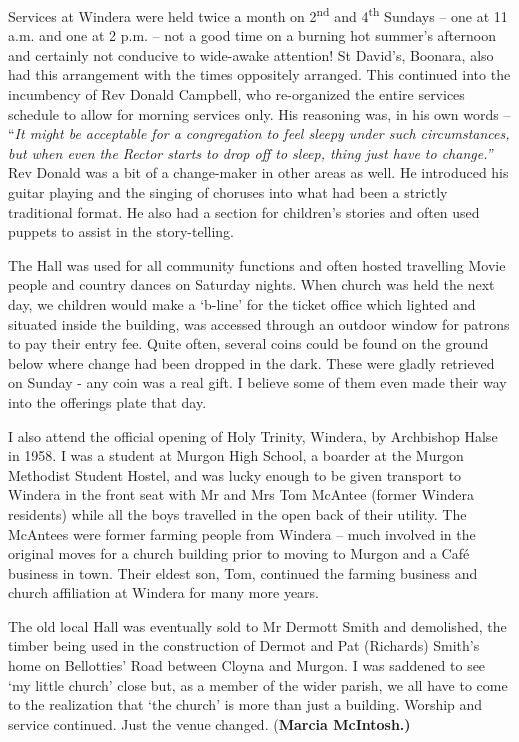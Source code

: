 Services at Windera were held twice a month on 2\textsuperscript{nd} and 4\textsuperscript{th} Sundays -- one at 11 a.m. and one at 2 p.m. -- not a good time on a burning hot summer's afternoon and certainly not conducive to wide-awake attention! St David's, Boonara, also had this arrangement with the times oppositely arranged. This continued into the incumbency of Rev Donald Campbell, who re-organized the entire services schedule to allow for morning services only. His reasoning was, in his own words -- ``\emph{It might be acceptable for a congregation to feel sleepy under such circumstances, but when even the Rector starts to drop off to sleep, thing just have to change.''} Rev Donald was a bit of a change-maker in other areas as well. He introduced his guitar playing and the singing of choruses into what had been a strictly traditional format. He also had a section for children's stories and often used puppets to assist in the story-telling.

The Hall was used for all community functions and often hosted travelling Movie people and country dances on Saturday nights. When church was held the next day, we children would make a `b-line' for the ticket office which lighted and situated inside the building, was accessed through an outdoor window for patrons to pay their entry fee. Quite often, several coins could be found on the ground below where change had been dropped in the dark. These were gladly retrieved on Sunday - any coin was a real gift. I believe some of them even made their way into the offerings plate that day.

I also attend the official opening of Holy Trinity, Windera, by Archbishop Halse in 1958. I was a student at Murgon High School, a boarder at the Murgon Methodist Student Hostel, and was lucky enough to be given transport to Windera in the front seat with Mr and Mrs Tom McAntee (former Windera residents) while all the boys travelled in the open back of their utility. The McAntees were former farming people from Windera -- much involved in the original moves for a church building prior to moving to Murgon and a Café business in town. Their eldest son, Tom, continued the farming business and church affiliation at Windera for many more years.

The old local Hall was eventually sold to Mr Dermott Smith and demolished, the timber being used in the construction of Dermot and Pat (Richards) Smith's home on Bellotties' Road between Cloyna and Murgon. I was saddened to see `my little church' close but, as a member of the wider parish, we all have to come to the realization that `the church' is more than just a building. Worship and service continued. Just the venue changed. (\textbf{Marcia McIntosh.)}


